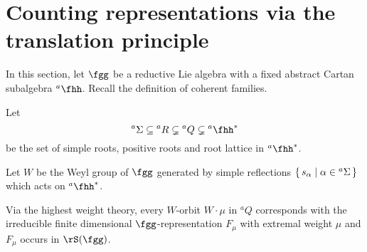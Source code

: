 \documentclass[12pt,a4paper]{amsart}
\numberwithin{equation}{section}
\theoremstyle{remark}
\def\Gc{G_\bC}
\def\hha{{}^a\fhh}
\def\ahh{\hha}
\def\aSR{{}^a\Sigma}
\def\aX{{}^aX}
\def\aQ{{}^aQ}
\def\aP{{}^aP}
\def\aR{{}^aR}
\def\Gfin{\cG(\Gc)}
\def\WT#1{\Delta(#1)}
\def\Glfin{\cG_{\Lambda}(\Gc)}
\begin{document}
\section{Counting representations via the translation principle}


In this section, let $\fgg$ be a reductive Lie algebra with a fixed abstract
Cartan subalgebra $\hha$. Recall the definition of coherent families.

Let
\[
  \aSR \subseteq \aR\subsetneq \aQ \subsetneq \ahh^{*}
\]
be the set of simple roots, positive roots and root lattice in $\ahh^{*}$.

Let $W$ be the Weyl group of $\fgg$ generated by simple reflections
$\set{s_{\alpha}|\alpha \in \aSR}$ which acts on $\ahh^{*}$.

Via the highest weight theory, every $W$-orbit $W\cdot \mu$ in $\aQ$ corresponds
with the irreducible finite dimensional $\fgg$-representation $F_{\mu}$ with
extremal weight $\mu$ and $F_{\mu}$ occurs in $\rS(\fgg)$.




\end{document}
